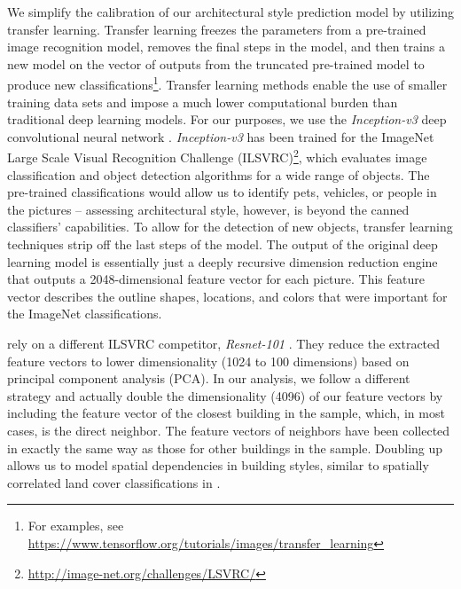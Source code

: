 \documentclass[]{article}
\begin{document}
We simplify the calibration of our architectural style prediction model by utilizing transfer learning. Transfer learning freezes the parameters from a pre-trained image recognition model, removes the final steps in the model, and then trains a new model on the vector of outputs from the truncated pre-trained model to produce new classifications\footnote{For examples, see \url{https://www.tensorflow.org/tutorials/images/transfer_learning}}. Transfer learning methods enable the use of smaller training data sets and impose a much lower computational burden than traditional deep learning models. 
For our purposes, we use the \emph{Inception-v3} deep convolutional
neural network \autocite{Szegedy2015}. \emph{Inception-v3} has been
trained for the ImageNet Large Scale Visual Recognition Challenge
(ILSVRC)\footnote{\url{http://image-net.org/challenges/LSVRC/}}, which
evaluates image classification and object detection algorithms for a
wide range of objects. The pre-trained classifications would allow us to
identify pets, vehicles, or people in the pictures -- assessing
architectural style, however, is beyond the canned classifiers'
capabilities. To allow for the detection of new objects, transfer learning techniques strip off the last steps of the model. The output of the original deep learning model is essentially just a deeply recursive dimension reduction engine that outputs a 2048-dimensional feature vector for each picture. This feature vector describes the outline shapes, locations, and colors that were important for the ImageNet classifications. 

\textcite{GlaeserKincaidNaik2018} rely on a different ILSVRC competitor, \emph{Resnet-101} \autocite{He2016}. They reduce the extracted feature vectors to lower dimensionality (1024 to 100 dimensions) based on principal component analysis (PCA). In our analysis, we follow a different strategy and actually double the dimensionality (4096) of our feature vectors by including the feature vector of the closest building in the sample, which, in most cases, is the direct neighbor. The feature vectors of neighbors have been collected in exactly the same way as those for other buildings in the sample. Doubling up allows us to model spatial dependencies in building styles, similar to spatially correlated land cover classifications in \textcite{Ghimire2010a}.
\end{document}
